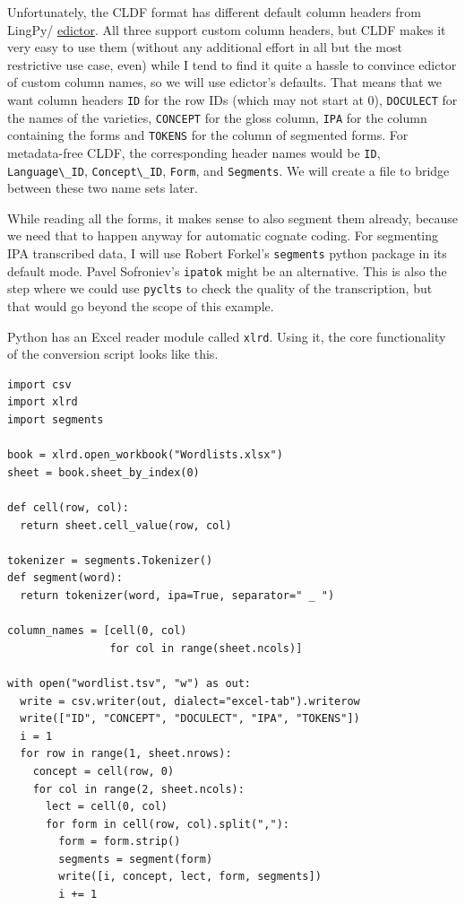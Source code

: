 \documentclass[
  english,
  a4paper,
  oneside,tablecaptionabove
]{scrbook}
\newcommand{\passthrough}[1]{#1}
\begin{document}
Unfortunately, the CLDF format has different default column headers from
LingPy/ \href{http://edictor.digling.org}{edictor}. All three support
custom column headers, but CLDF makes it very easy to use them (without
any additional effort in all but the most restrictive use case, even)
while I tend to find it quite a hassle to convince edictor of custom
column names, so we will use edictor's defaults. That means that we want
column headers \passthrough{\lstinline!ID!} for the row IDs (which may
not start at 0), \passthrough{\lstinline!DOCULECT!} for the names of the
varieties, \passthrough{\lstinline!CONCEPT!} for the gloss column,
\passthrough{\lstinline!IPA!} for the column containing the forms and
\passthrough{\lstinline!TOKENS!} for the column of segmented forms. For
metadata-free CLDF, the corresponding header names would be
\passthrough{\lstinline!ID!}, \passthrough{\lstinline!Language\_ID!},
\passthrough{\lstinline!Concept\_ID!}, \passthrough{\lstinline!Form!},
and \passthrough{\lstinline!Segments!}. We will create a file to bridge
between these two name sets later.

While reading all the forms, it makes sense to also segment them
already, because we need that to happen anyway for automatic cognate
coding. For segmenting IPA transcribed data, I will use Robert Forkel's
\passthrough{\lstinline!segments!} python package in its default mode.
Pavel Sofroniev's \passthrough{\lstinline!ipatok!} might be an
alternative. This is also the step where we could use
\passthrough{\lstinline!pyclts!} to check the quality of the
transcription, but that would go beyond the scope of this example.

Python has an Excel reader module called \passthrough{\lstinline!xlrd!}.
Using it, the core functionality of the conversion script looks like
this.

\begin{lstlisting}
import csv
import xlrd
import segments

book = xlrd.open_workbook("Wordlists.xlsx")
sheet = book.sheet_by_index(0)

def cell(row, col):
  return sheet.cell_value(row, col)

tokenizer = segments.Tokenizer()
def segment(word):
  return tokenizer(word, ipa=True, separator=" _ ")

column_names = [cell(0, col)
                for col in range(sheet.ncols)]

with open("wordlist.tsv", "w") as out:
  write = csv.writer(out, dialect="excel-tab").writerow
  write(["ID", "CONCEPT", "DOCULECT", "IPA", "TOKENS"])
  i = 1
  for row in range(1, sheet.nrows):
    concept = cell(row, 0)
    for col in range(2, sheet.ncols):
      lect = cell(0, col)
      for form in cell(row, col).split(","):
        form = form.strip()
        segments = segment(form)
        write([i, concept, lect, form, segments])
        i += 1
\end{lstlisting}
\end{document}
